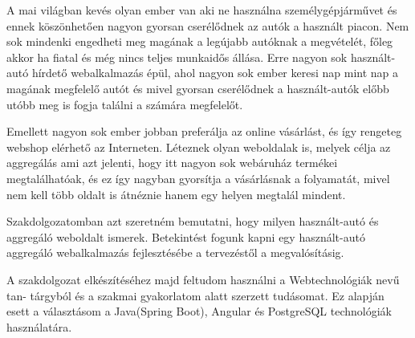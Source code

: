 
A mai világban kevés olyan ember van aki ne használna személygépjárművet és ennek köszönhetően nagyon gyorsan cserélődnek az autók a használt piacon. Nem sok mindenki engedheti meg magának a legújabb autóknak a megvételét, főleg akkor ha fiatal és még nincs teljes munkaidős állása. Erre nagyon sok használt-autó hírdető webalkalmazás épül, ahol nagyon sok ember keresi nap mint nap a magának megfelelő autót és mivel gyorsan cserélődnek a használt-autók előbb utóbb meg is fogja találni a számára megfelelőt.

Emellett nagyon sok ember jobban preferálja az online vásárlást, és így rengeteg webshop elérhető az Interneten. Léteznek olyan weboldalak is, melyek célja az aggregálás ami azt jelenti, hogy itt nagyon sok webáruház termékei megtalálhatóak, és ez így nagyban gyorsítja a vásárlásnak a folyamatát, mivel nem kell több oldalt is átnéznie hanem egy helyen megtalál mindent.

Szakdolgozatomban azt szeretném bemutatni, hogy milyen használt-autó és aggregáló weboldalt ismerek. Betekintést fogunk kapni egy használt-autó aggregáló webalkalmazás fejlesztésébe a tervezéstől a megvalósításig. 

A szakdolgozat elkészítéséhez majd feltudom használni a Webtechnológiák nevű tan-
tárgyból és a szakmai gyakorlatom alatt szerzett tudásomat. Ez alapján esett a választásom a Java(Spring Boot), Angular és PostgreSQL technológiák használatára.